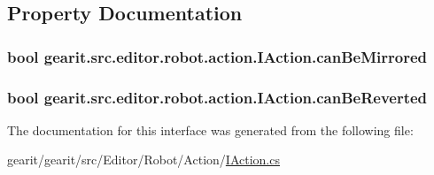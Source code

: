 \subsection{Property Documentation}
\hypertarget{interfacegearit_1_1src_1_1editor_1_1robot_1_1action_1_1_i_action_aac37cd50927ccf3cfadf24a7aeadca70}{
\subsubsection[{can\+Be\+Mirrored}]{\setlength{\rightskip}{0pt plus 5cm}bool gearit.\+src.\+editor.\+robot.\+action.\+I\+Action.\+can\+Be\+Mirrored\hspace{0.3cm}{\ttfamily [get]}}}\label{interfacegearit_1_1src_1_1editor_1_1robot_1_1action_1_1_i_action_aac37cd50927ccf3cfadf24a7aeadca70}
\hypertarget{interfacegearit_1_1src_1_1editor_1_1robot_1_1action_1_1_i_action_a26e787190ad78f043987f4d8d0427b8f}{
\subsubsection[{can\+Be\+Reverted}]{\setlength{\rightskip}{0pt plus 5cm}bool gearit.\+src.\+editor.\+robot.\+action.\+I\+Action.\+can\+Be\+Reverted\hspace{0.3cm}{\ttfamily [get]}}}\label{interfacegearit_1_1src_1_1editor_1_1robot_1_1action_1_1_i_action_a26e787190ad78f043987f4d8d0427b8f}


The documentation for this interface was generated from the following file\+:\begin{DoxyCompactItemize}
\item 
gearit/gearit/src/\+Editor/\+Robot/\+Action/\hyperlink{_robot_2_action_2_i_action_8cs}{I\+Action.\+cs}\end{DoxyCompactItemize}
